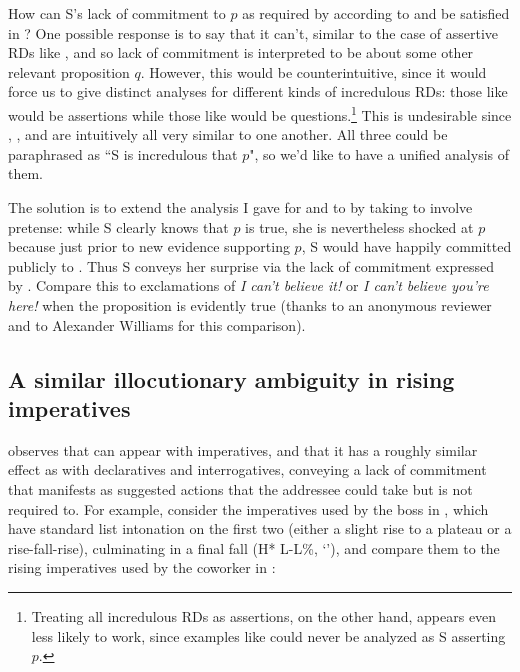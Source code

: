 \documentclass[output=paper,colorlinks,citecolor=brown]{langscibook}
\begin{document}
	How can S's lack of commitment to $p$ as required by \rise according to  and  be satisfied in ? One possible response is to say that it can't, similar to the case of assertive RDs like , and so lack of commitment is interpreted to be about some other relevant proposition $q$. However, this would be counterintuitive, since it would force us to give distinct analyses for different kinds of incredulous RDs: those like  would be assertions while those like  would be questions.\footnote{Treating all incredulous RDs as assertions, on the other hand, appears even less likely to work, since examples like  could never be analyzed as S asserting $p$.} This is  undesirable since , , and  are intuitively all very similar to one another. All three could be paraphrased as ``S is incredulous that $p$", so we'd like to have a unified analysis of them.
	
	The solution is to extend the analysis I gave for  and  to  by taking  to involve pretense: while S clearly knows that $p$ is true, she is nevertheless shocked at $p$ because just prior to new evidence supporting $p$, S would have happily committed publicly to \notp. Thus S conveys her surprise via the lack of commitment expressed by \rise. Compare this to exclamations of \emph{I can't believe it!} or \emph{I can't believe you're here!} when the proposition is evidently true (thanks to an anonymous reviewer and to Alexander Williams for this comparison). 
	
	
	
	
	
\subsection{A similar illocutionary ambiguity in rising imperatives} \label{riseImps}
	
	
	\citet{rudin18} observes that \rise can appear with imperatives, and that it has a roughly similar effect as with declaratives and interrogatives, conveying a lack of commitment that manifests as suggested actions that the addressee could take but is not required to. For example, consider the imperatives used by the boss in , which have standard list intonation on the first two (either a slight rise to a plateau or a rise-fall-rise), culminating in a final fall (H* L-L\%, `\fall'), and compare them to the rising imperatives used by the coworker in : 
	
\end{document}
